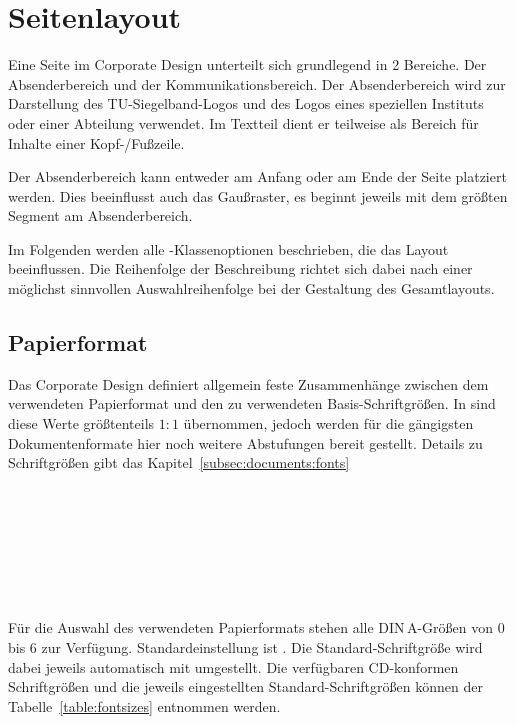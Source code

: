 \section{Seitenlayout}\label{sec:pagelayout}

Eine Seite im Corporate Design unterteilt sich grundlegend in 2 Bereiche.
Der Absenderbereich und der Kommunikationsbereich. Der Absenderbereich wird zur
Darstellung des TU-Siegelband-Logos und des Logos eines speziellen Instituts
oder einer Abteilung verwendet. Im Textteil dient er teilweise als Bereich für
Inhalte einer Kopf-/Fußzeile.

Der Absenderbereich kann entweder am Anfang oder am Ende der Seite platziert
werden. Dies beeinflusst auch das Gaußraster, es beginnt jeweils mit dem
größten Segment am Absenderbereich.
\bigskip

Im Folgenden werden alle \tubslatex-Klassenoptionen beschrieben,
die das Layout beeinflussen. Die Reihenfolge der Beschreibung richtet sich dabei
nach einer möglichst sinnvollen Auswahlreihenfolge bei der Gestaltung des Gesamtlayouts.

\subsection{Papierformat}

Das Corporate Design definiert allgemein feste Zusammenhänge zwischen dem
verwendeten Papierformat und den zu verwendeten Basis-Schriftgrößen.
In \tubslatex sind diese Werte größtenteils $1:1$ übernommen, jedoch
werden für die gängigsten Dokumentenformate hier noch weitere Abstufungen 
bereit gestellt. Details zu Schriftgrößen gibt das Kapitel~\ref{subsec:documents:fonts}

\begin{Declaration}
  \\
  \\
  \\
  \\
  \\
  \\
\end{Declaration}

Für die Auswahl des verwendeten Papierformats stehen alle DIN\,A-Größen von
0 bis 6 zur Verfügung. Standardeinstellung ist .
Die Standard-Schriftgröße wird dabei jeweils automatisch mit umgestellt.
Die verfügbaren \acs{CD}-konformen Schriftgrößen und die jeweils eingestellten
Standard-Schriftgrößen können der Tabelle~\ref{table:fontsizes}
entnommen werden.

